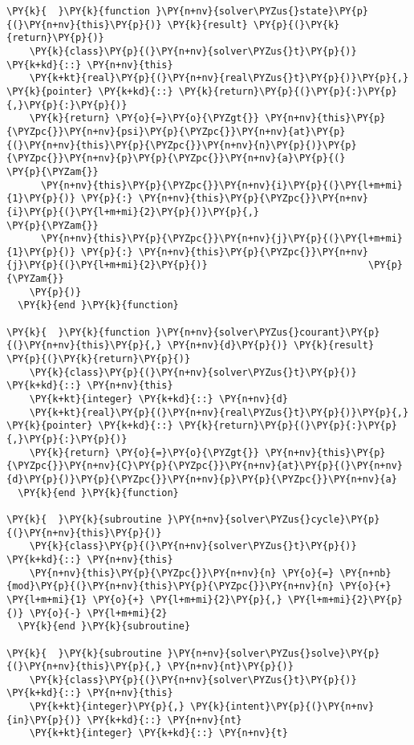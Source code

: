 \begin{Verbatim}[commandchars=\\\{\}]
\PY{k}{  }\PY{k}{function }\PY{n+nv}{solver\PYZus{}state}\PY{p}{(}\PY{n+nv}{this}\PY{p}{)} \PY{k}{result} \PY{p}{(}\PY{k}{return}\PY{p}{)}
    \PY{k}{class}\PY{p}{(}\PY{n+nv}{solver\PYZus{}t}\PY{p}{)} \PY{k+kd}{::} \PY{n+nv}{this}
    \PY{k+kt}{real}\PY{p}{(}\PY{n+nv}{real\PYZus{}t}\PY{p}{)}\PY{p}{,} \PY{k}{pointer} \PY{k+kd}{::} \PY{k}{return}\PY{p}{(}\PY{p}{:}\PY{p}{,}\PY{p}{:}\PY{p}{)}
    \PY{k}{return} \PY{o}{=}\PY{o}{\PYZgt{}} \PY{n+nv}{this}\PY{p}{\PYZpc{}}\PY{n+nv}{psi}\PY{p}{\PYZpc{}}\PY{n+nv}{at}\PY{p}{(}\PY{n+nv}{this}\PY{p}{\PYZpc{}}\PY{n+nv}{n}\PY{p}{)}\PY{p}{\PYZpc{}}\PY{n+nv}{p}\PY{p}{\PYZpc{}}\PY{n+nv}{a}\PY{p}{(}                 \PY{p}{\PYZam{}}
      \PY{n+nv}{this}\PY{p}{\PYZpc{}}\PY{n+nv}{i}\PY{p}{(}\PY{l+m+mi}{1}\PY{p}{)} \PY{p}{:} \PY{n+nv}{this}\PY{p}{\PYZpc{}}\PY{n+nv}{i}\PY{p}{(}\PY{l+m+mi}{2}\PY{p}{)}\PY{p}{,}                           \PY{p}{\PYZam{}}
      \PY{n+nv}{this}\PY{p}{\PYZpc{}}\PY{n+nv}{j}\PY{p}{(}\PY{l+m+mi}{1}\PY{p}{)} \PY{p}{:} \PY{n+nv}{this}\PY{p}{\PYZpc{}}\PY{n+nv}{j}\PY{p}{(}\PY{l+m+mi}{2}\PY{p}{)}                            \PY{p}{\PYZam{}}
    \PY{p}{)}
  \PY{k}{end }\PY{k}{function}

\PY{k}{  }\PY{k}{function }\PY{n+nv}{solver\PYZus{}courant}\PY{p}{(}\PY{n+nv}{this}\PY{p}{,} \PY{n+nv}{d}\PY{p}{)} \PY{k}{result} \PY{p}{(}\PY{k}{return}\PY{p}{)}
    \PY{k}{class}\PY{p}{(}\PY{n+nv}{solver\PYZus{}t}\PY{p}{)} \PY{k+kd}{::} \PY{n+nv}{this}
    \PY{k+kt}{integer} \PY{k+kd}{::} \PY{n+nv}{d}
    \PY{k+kt}{real}\PY{p}{(}\PY{n+nv}{real\PYZus{}t}\PY{p}{)}\PY{p}{,} \PY{k}{pointer} \PY{k+kd}{::} \PY{k}{return}\PY{p}{(}\PY{p}{:}\PY{p}{,}\PY{p}{:}\PY{p}{)}
    \PY{k}{return} \PY{o}{=}\PY{o}{\PYZgt{}} \PY{n+nv}{this}\PY{p}{\PYZpc{}}\PY{n+nv}{C}\PY{p}{\PYZpc{}}\PY{n+nv}{at}\PY{p}{(}\PY{n+nv}{d}\PY{p}{)}\PY{p}{\PYZpc{}}\PY{n+nv}{p}\PY{p}{\PYZpc{}}\PY{n+nv}{a}
  \PY{k}{end }\PY{k}{function}

\PY{k}{  }\PY{k}{subroutine }\PY{n+nv}{solver\PYZus{}cycle}\PY{p}{(}\PY{n+nv}{this}\PY{p}{)}
    \PY{k}{class}\PY{p}{(}\PY{n+nv}{solver\PYZus{}t}\PY{p}{)} \PY{k+kd}{::} \PY{n+nv}{this}
    \PY{n+nv}{this}\PY{p}{\PYZpc{}}\PY{n+nv}{n} \PY{o}{=} \PY{n+nb}{mod}\PY{p}{(}\PY{n+nv}{this}\PY{p}{\PYZpc{}}\PY{n+nv}{n} \PY{o}{+} \PY{l+m+mi}{1} \PY{o}{+} \PY{l+m+mi}{2}\PY{p}{,} \PY{l+m+mi}{2}\PY{p}{)} \PY{o}{-} \PY{l+m+mi}{2}
  \PY{k}{end }\PY{k}{subroutine}

\PY{k}{  }\PY{k}{subroutine }\PY{n+nv}{solver\PYZus{}solve}\PY{p}{(}\PY{n+nv}{this}\PY{p}{,} \PY{n+nv}{nt}\PY{p}{)}
    \PY{k}{class}\PY{p}{(}\PY{n+nv}{solver\PYZus{}t}\PY{p}{)} \PY{k+kd}{::} \PY{n+nv}{this}
    \PY{k+kt}{integer}\PY{p}{,} \PY{k}{intent}\PY{p}{(}\PY{n+nv}{in}\PY{p}{)} \PY{k+kd}{::} \PY{n+nv}{nt}
    \PY{k+kt}{integer} \PY{k+kd}{::} \PY{n+nv}{t}


\end{Verbatim}
